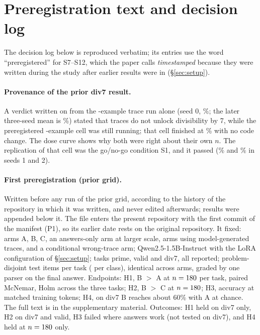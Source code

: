 \documentclass{article}
\theoremstyle{definition}
\begin{document}
\section{Preregistration text and decision log}
\label{app:prereg}
The decision log below is reproduced verbatim; its entries use the word ``preregistered'' for S7--S12, which the paper calls \emph{timestamped} because they were written during the study after earlier results were in (\S\ref{sec:setup}).

\paragraph{Provenance of the prior div7 result.} A verdict written on \priorVerdictDate{} from the \nTrainSmall-example trace run alone (seed 0, \divsevenBsmallsZero\%; the later three-seed mean is \divsevenBsmall\%) stated that traces do not unlock divisibility by 7, while the preregistered \nTrain-example cell was still running; that cell finished at \divsevenBsZero\% with no code change. The dose curve shows why both were right about their own $n$. The replication of that cell was the go/no-go condition S1, and it passed (\divsevenBsOne\% and \divsevenBsTwo\% in seeds 1 and 2).

\paragraph{First preregistration (prior grid).} Written before any run of the prior grid, according to the history of the repository in which it was written, and never edited afterwards; results were appended below it. The file enters the present repository with the first commit of the manifest (P1), so its earlier date rests on the original repository. It fixed: arms A, B, C, an answers-only arm at larger scale, arms using model-generated traces, and a conditional wrong-trace arm; Qwen2.5-1.5B-Instruct with the LoRA configuration of \S\ref{sec:setup}; tasks prime, valid and div7, all reported; \nTest{} problem-disjoint test items per task (\nTestClass{} per class), identical across arms, graded by one parser on the final answer. Endpoints: H1, B $>$ A at $n=180$ per task, paired McNemar, Holm across the three tasks; H2, B $>$ C at $n=180$; H3, accuracy at matched training tokens; H4, on div7 B reaches about 60\% with A at chance. The full text is in the supplementary material. Outcomes: H1 held on div7 only, H2 on div7 and valid, H3 failed where answers work (not tested on div7), and H4 held at $n=180$ only.
\end{document}
